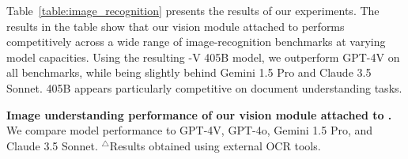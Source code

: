 Table~\ref{table:image_recognition} presents the results of our experiments.
The results in the table show that our vision module attached to \llamathree performs competitively across a wide range of image-recognition benchmarks at varying model capacities.
Using the resulting \llamathree-V 405B model, we outperform GPT-4V on all benchmarks, while being slightly behind Gemini 1.5 Pro and Claude 3.5 Sonnet.
\llamathree 405B appears particularly competitive on document understanding tasks.

\begin{table}[t]
    \centering
    \resizebox{\linewidth}{!}{}
    \caption{\textbf{Image understanding performance of our vision module attached to \llamathree.} We compare model performance to GPT-4V, GPT-4o, Gemini 1.5 Pro, and Claude 3.5 Sonnet. $^{\triangle}$Results obtained using external OCR tools.}
    \label{table:image_recognition}
\end{table}
